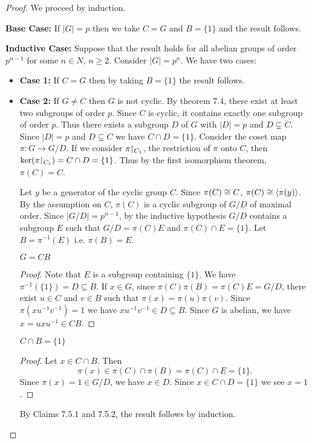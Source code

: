 \documentclass[11pt]{article}
\begin{document}
\begin{proof}
    We proceed by induction.

    \noindent\textbf{Base Case:} If $|G|=p$ then we take $C=G$ and $B=\{1\}$ and the result follows.
    
    \noindent\textbf{Inductive Case:} Suppose that the result holds for all abelian groups of order $p^{n-1}$ for some $n\in N$, $n\geq 2$. Consider $|G|=p^n$. We have two cases:

    \begin{itemize}
        \item\textbf{Case 1:} If $C=G$ then by taking $B=\{1\}$ the result follows.

        \item\textbf{Case 2:} If $G\neq C$ then $G$ is not cyclic. By theorem 7.4, there exist at least two subgroups of order $p$. Since $C$ is cyclic, it contains exactly one subgroup of order $p$. Thus there exists a subgroup $D$ of $G$ with $|D|=p$ and $D\subsetneq C$. Since $|D|=p$ and $D\subsetneq C$ we have $C\cap D=\{1\}$. Consider the coset map $\pi:G\to G/D$. If we consider $\pi\hspace{-3pt}\upharpoonright_{C_1}$, the restriction of $\pi$ onto $C$, then $\ker(\pi\hspace{-3pt}\upharpoonright_{C_1})=C\cap D=\{1\}$. Thus by the first isomorphism theorem, $\pi(C)=C$.

        Let $y$ be a generator of the cyclic group $C$. Since $\pi(C)\cong C$, $\pi(C)\cong\langle\pi(y)\rangle$. By the assumption on $C$, $\pi(C)$ is a cyclic subgroup of $G/D$ of maximal order. Since $|G/D|=p^{n-1}$, by the inductive hypothesis $G/D$ contains a subgroup $E$ such that $G/D=\pi(C)E$ and $\pi(C)\cap E=\{1\}$. Let $B=\pi^{-1}(E)$ i.e. $\pi(B)=E$.
        \begin{claim}
            $G=CB$
        \end{claim}
        \begin{proof}
            Note that $E$ is a subgroup containing $\{1\}$. We have $\pi^{-1}(\{1\})=D\subseteq B$. If $x\in G$, since $\pi(C)\pi(B)=\pi(C)E=G/D$, there exist $u\in C$ and $v\in B$ such that $\pi(x)=\pi(u)\pi(v)$. Since $\pi(xu^{-1}v^{-1})=1$ we have $xu^{-1}v^{-1}\in D\subseteq B$. Since $G$ is abelian, we have $x=uxu^{-1}\in CB$.
        \end{proof}
        \begin{claim}
            $C\cap B=\{1\}$
        \end{claim}
        \begin{proof}
            Let $x\in C\cap B$. Then \[\pi(x)\in\pi(C)\cap\pi(B)=\pi(C)\cap E=\{1\}.\]
            Since $\pi(x)=1\in G/D$, we have $x\in D$. Since $x\in C\cap D=\{1\}$ we see $x=1$.
        \end{proof}
        By Claims 7.5.1 and 7.5.2, the result follows by induction.
    \end{itemize}
\end{proof}
\end{document}
